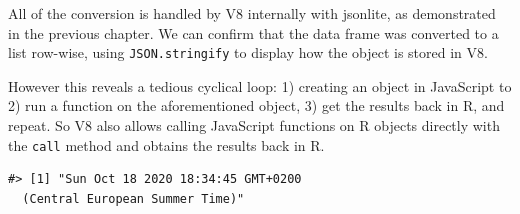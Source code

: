 \documentclass[10pt,]{krantz}
\makeatletter
\newenvironment{Shaded}{\begin{snugshade}}{\end{snugshade}}
\newcommand{\CommentTok}[1]{\textcolor[rgb]{0.37,0.37,0.37}{\textit{#1}}}
\newcommand{\DecValTok}[1]{\textcolor[rgb]{0.06,0.06,0.06}{#1}}
\newcommand{\KeywordTok}[1]{\textcolor[rgb]{0.27,0.27,0.27}{\textbf{#1}}}
\newcommand{\NormalTok}[1]{#1}
\newcommand{\OperatorTok}[1]{\textcolor[rgb]{0.43,0.43,0.43}{\textbf{#1}}}
\newcommand{\StringTok}[1]{\textcolor[rgb]{0.5,0.5,0.5}{#1}}
\newenvironment{kframe}{%
\medskip{}
\setlength{\fboxsep}{.8em}
 \def\at@end@of@kframe{}%
 \ifinner\ifhmode%
  \def\at@end@of@kframe{\end{minipage}}%
  \begin{minipage}{\columnwidth}%
 \fi\fi%
 \def\FrameCommand##1{\hskip\@totalleftmargin \hskip-\fboxsep
 \colorbox{shadecolor}{##1}\hskip-\fboxsep
     \hskip-\linewidth \hskip-\@totalleftmargin \hskip\columnwidth}%
 \MakeFramed {\advance\hsize-\width
   \@totalleftmargin\z@ \linewidth\hsize
   \@setminipage}}%
 {\par\unskip\endMakeFramed%
 \at@end@of@kframe}
\renewenvironment{Shaded}{\begin{kframe}}{\end{kframe}}
\makeatother
\begin{document}
\begin{Shaded}
\end{Shaded}

All of the conversion is handled by V8 internally with jsonlite, as demonstrated in the previous chapter. We can confirm that the data frame was converted to a list row-wise, using \texttt{JSON.stringify} to display how the object is stored in V8.

\begin{Shaded}
\end{Shaded}

However this reveals a tedious cyclical loop: 1) creating an object in JavaScript to 2) run a function on the aforementioned object, 3) get the results back in R, and repeat. So V8 also allows calling JavaScript functions on R objects directly with the \texttt{call} method and obtains the results back in R.

\begin{Shaded}
\end{Shaded}

\begin{verbatim}
#> [1] "Sun Oct 18 2020 18:34:45 GMT+0200 
  (Central European Summer Time)"
\end{verbatim}
\end{document}
